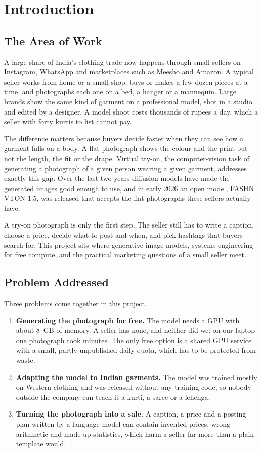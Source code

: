\chapter{Introduction}

\section{The Area of Work}

A large share of India's clothing trade now happens through small sellers on Instagram, WhatsApp and marketplaces such as Meesho and Amazon. A typical seller works from home or a small shop, buys or makes a few dozen pieces at a time, and photographs each one on a bed, a hanger or a mannequin. Large brands show the same kind of garment on a professional model, shot in a studio and edited by a designer. A model shoot costs thousands of rupees a day, which a seller with forty kurtis to list cannot pay.

The difference matters because buyers decide faster when they can see how a garment falls on a body. A flat photograph shows the colour and the print but not the length, the fit or the drape. Virtual try-on, the computer-vision task of generating a photograph of a given person wearing a given garment, addresses exactly this gap. Over the last two years diffusion models have made the generated images good enough to use, and in early 2026 an open model, FASHN VTON 1.5, was released that accepts the flat photographs these sellers actually have.

A try-on photograph is only the first step. The seller still has to write a caption, choose a price, decide what to post and when, and pick hashtags that buyers search for. This project sits where generative image models, systems engineering for free compute, and the practical marketing questions of a small seller meet.

\section{Problem Addressed}

Three problems come together in this project.

\begin{enumerate}
\item \textbf{Generating the photograph for free.} The model needs a GPU with about 8~GB of memory. A seller has none, and neither did we: on our laptop one photograph took \vGenMinutes{} minutes. The only free option is a shared GPU service with a small, partly unpublished daily quota, which has to be protected from waste.
\item \textbf{Adapting the model to Indian garments.} The model was trained mostly on Western clothing and was released without any training code, so nobody outside the company can teach it a kurti, a saree or a lehenga.
\item \textbf{Turning the photograph into a sale.} A caption, a price and a posting plan written by a language model can contain invented prices, wrong arithmetic and made-up statistics, which harm a seller far more than a plain template would.
\end{enumerate}


